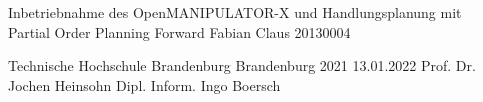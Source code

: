 \usepackage{amssymb}
\usepackage{stmaryrd}




  \JMUTitle
      {Inbetriebnahme des OpenMANIPULATOR-X und Handlungsplanung mit\\ Partial Order Planning Forward}        %
      {Fabian Claus}                        %
      {20130004}
      
      {Technische Hochschule Brandenburg}  %
      {Brandenburg 2021}                          %
      {13.01.2022}                              %
      {Prof. Dr. Jochen Heinsohn}               %
      {Dipl. Inform. Ingo Boersch}                          %

  \clearpage

  
  \lhead{}
  \setcounter{page}{1}

  \tableofcontents
  \clearpage



{} %
\listoffigures

